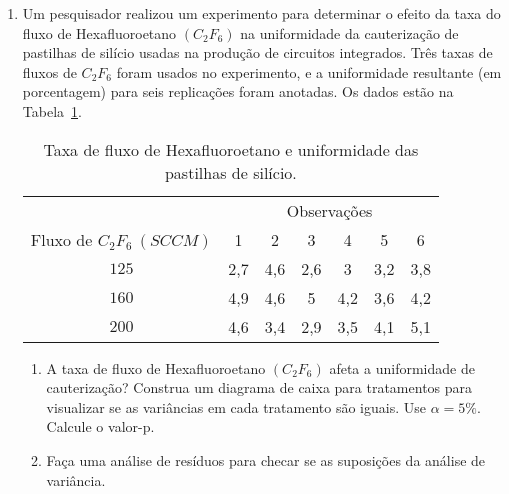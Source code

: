 \documentclass[11pt, a4paper]{article}
\begin{document}
\begin{enumerate}
	\item Um pesquisador realizou um experimento para determinar o efeito da taxa do fluxo de Hexafluoroetano $(C_2F_6)$ na uniformidade da cauterização de pastilhas de silício usadas na produção de circuitos integrados. Três taxas de fluxos de $C_2F_6$ foram usados no experimento, e a uniformidade resultante (em porcentagem) para seis replicações foram anotadas. Os dados estão na Tabela~\ref{tab:hexafluoroetano}.
	\begin{table}[htbp]
		\centering
		\begin{tabular}{c|cccccc}
			\toprule[0.05cm]
			 & \multicolumn{6}{|c}{Observações} \\ \cmidrule[0.025cm]{2-7}
			 Fluxo de $C_2F_6\ (SCCM)$	& 1 & 2 & 3 & 4 & 5 & 6\\ \midrule[0.025cm]
			 $125$ & 2,7 & 4,6 & 2,6 & 3 & 3,2 & 3,8\\
			 $160$ & 4,9 & 4,6 & 5 & 4,2 & 3,6 & 4,2\\
			 $200$ & 4,6 & 3,4 & 2,9 & 3,5 & 4,1 & 5,1\\ \bottomrule[0.05cm]
		\end{tabular}
		\caption{Taxa de fluxo de Hexafluoroetano e uniformidade das pastilhas de silício.}
		\label{tab:hexafluoroetano}
	\end{table}
	\begin{enumerate}
		\item A taxa de fluxo de Hexafluoroetano $(C_2F_6)$ afeta a uniformidade de cauterização? Construa um diagrama de caixa para tratamentos para visualizar se as variâncias em cada tratamento são iguais. Use $\alpha = 5\%$. Calcule o valor-p.
		\item Faça uma análise de resíduos para checar se as suposições da análise de variância.
	\end{enumerate}


\end{enumerate}
\end{document}
